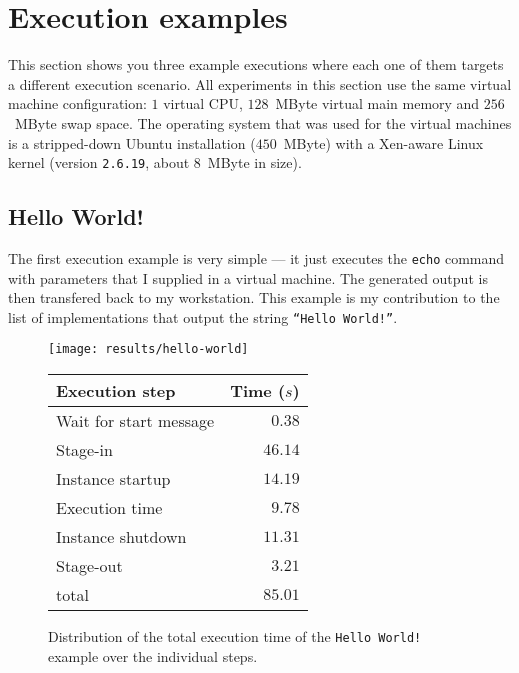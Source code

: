 \section{Execution examples}
\label{sec:sample-jobs}

This section  shows you  three example executions  where each one  of them
targets a  different execution scenario.  All experiments  in this section
use the  same virtual machine configuration: $1$  virtual CPU, $128$~MByte
virtual main memory and $256$~MByte swap space.  The operating system that
was used for  the virtual machines is a  stripped-down Ubuntu installation
($450$~MByte)  with  a Xen-aware  Linux  kernel (version  \texttt{2.6.19},
about $8$~MByte in size).

\subsection{Hello World!}
\label{sec:hello-world}

The  first execution  example  is very  simple  --- it  just executes  the
\texttt{echo}  command  with  parameters  that  I supplied  in  a  virtual
machine. The generated  output is then transfered back  to my workstation.
This example is my contribution to the list of implementations that output
the string \texttt{``Hello World!''}.

\begin{figure}[ht]
  \begin{minipage}{0.48\columnwidth}%
    \centering
    \texttt{[image: results/hello-world]}
  \end{minipage}%
  \hfill%
  \begin{minipage}{0.48\columnwidth}%
    \begin{tabular}{@{}lr@{}}\toprule
      Execution step         &   Time ($s$) \\ \midrule %
      Wait for start message &   $  0.38 $  \\
      Stage-in               &   $ 46.14 $  \\
      Instance startup       &   $ 14.19 $  \\
      Execution time         &   $  9.78 $  \\
      Instance shutdown      &   $ 11.31 $  \\
      Stage-out              &   $  3.21 $  \\
      total                  &   $ 85.01 $  \\ \bottomrule
    \end{tabular}
  \end{minipage}%
  \vspace{1em}
  \caption[Hello  World  example   execution]{Distribution  of  the  total
    execution  time   of  the  \texttt{Hello  World!}   example  over  the
    individual steps.}
  \label{fig:hello-world}
\end{figure}


